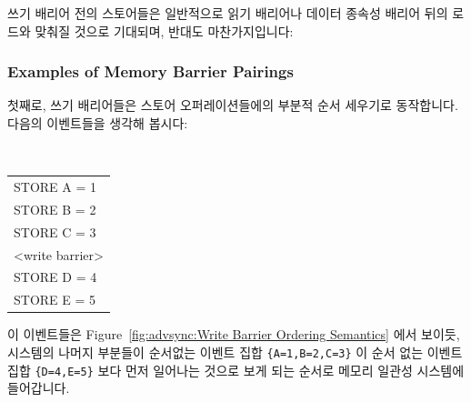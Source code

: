 \begin{enumerate}
쓰기 배리어 전의 스토어들은 일반적으로 읽기 배리어나 데이터 종속성 배리어 뒤의
로드와 맞춰질 것으로 기대되며, 반대도 마찬가지입니다:

\begin{center}
\end{center}

\subsubsection{Examples of Memory Barrier Pairings}
\label{sec:advsync:Examples of Memory Barrier Pairings}

첫째로, 쓰기 배리어들은 스토어 오퍼레이션들에의 부분적 순서 세우기로
동작합니다.
다음의 이벤트들을 생각해 봅시다:

\vspace{5pt}
\begin{minipage}[t]{\columnwidth}
\tt
\scriptsize
\begin{tabular}{l}
	STORE A = 1 \\
	STORE B = 2 \\
	STORE C = 3 \\
	<write barrier> \\
	STORE D = 4 \\
	STORE E = 5 \\
\end{tabular}
\end{minipage}
\vspace{5pt}

이 이벤트들은 Figure~\ref{fig:advsync:Write Barrier Ordering Semantics} 에서
보이듯, 시스템의 나머지 부분들이 순서없는 이벤트 집합 {\tt \{A=1,B=2,C=3\}} 이
순서 없는 이벤트 집합 {\tt \{D=4,E=5\}} 보다 먼저 일어나는 것으로 보게 되는
순서로 메모리 일관성 시스템에 들어갑니다.

\end{enumerate}
